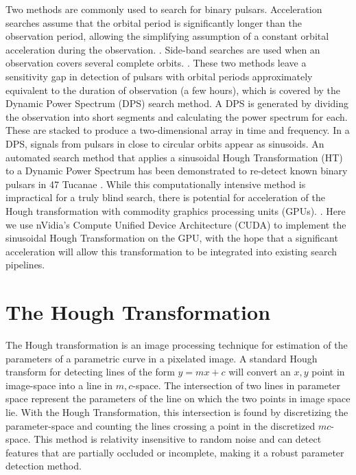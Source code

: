 \documentclass[11pt,twoside]{article}
\begin{document}
Two methods are commonly used to search for binary pulsars.
Acceleration searches assume that the orbital period is significantly longer than the observation period, allowing the simplifying assumption of a constant orbital acceleration during the observation. \citep{camilo2000observations,ransom2002fourier, Ransom2001a}.
Side-band searches are used when an observation covers several complete orbits. \citep{Jouteux2002a, Ransom2003}.
These two methods leave a sensitivity gap in detection of pulsars with orbital periods approximately equivalent to the duration of observation (a few hours), which is covered by the Dynamic Power Spectrum (DPS) search method.
A DPS is generated by dividing the observation into short segments and calculating the power spectrum for each.
These are stacked to produce a two-dimensional array in time and frequency. In a DPS, signals from pulsars in close to circular orbits appear as sinusoids.
An automated search method that applies a sinusoidal Hough Transformation (HT) to a Dynamic Power Spectrum has been demonstrated to re-detect known binary pulsars in 47 Tucanae \citep{aulbert2005finding, aulbert2007finding}.
While this computationally intensive method is impractical for a truly blind search, there is potential for acceleration of the Hough transformation with commodity graphics processing units (GPUs). \citep{aulbert2005finding}.
Here we use nVidia's Compute Unified Device Architecture (CUDA) to implement the sinusoidal Hough Transformation on the GPU, with the hope that a significant acceleration will allow this transformation to be integrated into existing search pipelines.

\section{The Hough Transformation}

The Hough transformation is an image processing technique for estimation of the parameters of a parametric curve in a pixelated image.
A standard Hough transform for detecting lines of the form $y=mx+c$ will convert an $x,y$ point in image-space into a line in $m,c$-space.
The intersection of two lines in parameter space represent the parameters of the line on which the two points in image space lie.
With the Hough Transformation, this intersection is found by discretizing the parameter-space and counting the lines crossing a point in the discretized $mc$-space.
This method is relativity insensitive to random noise and can detect features that are partially occluded or incomplete, making it a robust parameter detection method.
\end{document}
